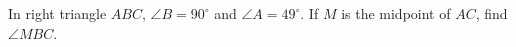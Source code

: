 In right triangle $ABC$, $\angle B=90^\circ$ and $\angle A=49^\circ$. If $M$ is the midpoint of $AC$, find $\angle MBC$.
